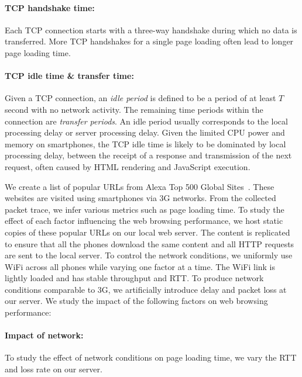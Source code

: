 
\paragraph{TCP handshake time:} Each TCP connection starts with a
three-way handshake during which no data is transferred. More TCP 
handshakes for a single page loading often lead to longer page loading 
time.

\paragraph{TCP idle time \& transfer time:} Given a TCP connection, 
an {\it idle period} is defined to be a period of at least $T$ second 
with no network activity. The remaining time periods within the 
connection are {\it transfer periods}. An idle period usually 
corresponds to the local processing delay or server processing 
delay. Given the limited CPU power and memory on smartphones, the 
TCP idle time is likely to be dominated by local processing delay, 
\eg between the receipt of a response and transmission of the next 
request, often caused by HTML rendering and JavaScript execution.

\label{sec:web_controlled}

We create a list of popular URLs from Alexa Top 500 Global Sites~\cite{Alexa}. These websites 
are visited using smartphones via 3G networks. From the collected 
packet trace, we infer various metrics such as page loading time.
To study the effect of each factor influencing the web browsing
performance, we host static copies of these popular URLs on our 
local web server. The content is replicated to ensure that all the 
phones download the same content and all HTTP requests are sent to 
the local server. To control the network conditions, we uniformly 
use WiFi across all phones while varying one factor at a time. 
The WiFi link is lightly loaded and has stable throughput and RTT. 
To produce network conditions comparable to 3G, we artificially 
introduce delay and packet loss at our server. We study the impact 
of the following factors on web browsing performance:

\paragraph{Impact of network:} To study the effect of network
conditions on page loading time, we vary the RTT and loss rate 
on our server. %

